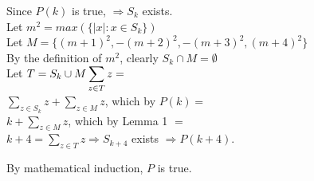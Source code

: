 \documentclass[fleqn]{article}
\begin{document}
Since $P(k)$ is true, $\Rightarrow S_{k}$ exists.\\
Let $m^2 = max(\lbrace |x| : x \in S_{k} \rbrace)$\\
Let $M = \lbrace (m+1)^2, -(m+2)^2, -(m+3)^2, (m+4)^2 \rbrace$\\
By the definition of $m^2$, clearly $S_{k} \cap M = \emptyset$\\
Let $T = S_{k} \cup M \\
\displaystyle\sum\limits_{z \in T} z =$\\
$\displaystyle\sum\limits_{z \in S_{k}} z + \displaystyle\sum\limits_{z \in M} z$, which by $P(k) =$\\
$k + \displaystyle\sum\limits_{z \in M} z$, which by Lemma 1 $=$\\
$k + 4 = \displaystyle\sum\limits_{z \in T} z \Rightarrow S_{k+4}$ exists $\Rightarrow P(k+4)$.

By mathematical induction, $P$ is true.
\end{document}
